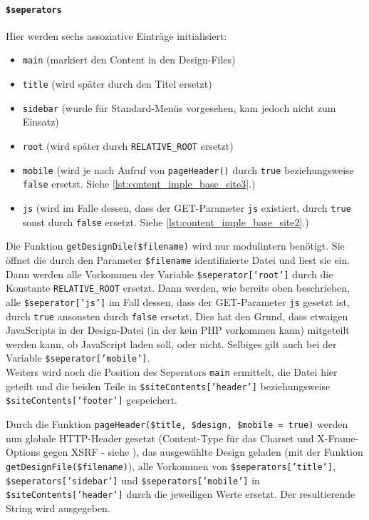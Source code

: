 \paragraph{\texttt{\$seperators}\\}
Hier werden sechs assoziative Einträge initialisiert:
\begin{itemize}
	\item \texttt{main} (markiert den Content in den Design-Files)
	\item \texttt{title} (wird später durch den Titel ersetzt)
	\item \texttt{sidebar} (wurde für Standard-Menüs vorgesehen, kam jedoch nicht zum Einsatz)
	\item \texttt{root} (wird später durch \texttt{RELATIVE\_ROOT} ersetzt)
	\item \texttt{mobile} (wird je nach Aufruf von \texttt{pageHeader()} durch \texttt{true} beziehungsweise \texttt{false} ersetzt. Siehe \autoref{lst:content_imple_base_site3}.)
	\item \texttt{js} (wird im Falle dessen, dass der GET-Parameter \texttt{js} existiert, durch \texttt{true} sonst durch \texttt{false} ersetzt. Siehe \autoref{lst:content_imple_base_site2}.)
\end{itemize}


Die Funktion \texttt{getDesignDile(\$filename)} wird nur modulintern benötigt. Sie öffnet die durch den Parameter \texttt{\$filename} identifizierte Datei und liest sie ein. Dann werden alle Vorkommen der Variable \texttt{\$seperator['root']} durch die Konstante \texttt{RELATIVE\_ROOT} ersetzt. Dann werden, wie bereits oben beschrieben, alle \texttt{\$seperator['js']} im Fall dessen, dass der GET-Parameter \texttt{js} gesetzt ist, durch \texttt{true} ansonsten durch \texttt{false} ersetzt. Dies hat den Grund, dass etwaigen JavaScripts in der Design-Datei (in der kein PHP vorkommen kann) mitgeteilt werden kann, ob JavaScript laden soll, oder nicht. Selbiges gilt auch bei der Variable \texttt{\$seperator['mobile']}.\\
Weiters wird noch die Position des Seperators \texttt{main} ermittelt, die Datei hier geteilt und die beiden Teile in \texttt{\$siteContents['header']} beziehungsweise \texttt{\$siteContents['footer']} gespeichert.


Durch die Funktion \texttt{pageHeader(\$title, \$design, \$mobile = true)} werden nun globale HTTP-Header gesetzt (Content-Type für das Charset und X-Frame-Options gegen XSRF - siehe ), das ausgewählte Design geladen (mit der Funktion \texttt{getDesignFile(\$filename)}), alle Vorkommen von \texttt{\$seperators['title']}, \texttt{\$seperators['sidebar']} und \texttt{\$seperators['mobile']} in \texttt{\$siteContents['header']} durch die jeweiligen Werte ersetzt. Der resultierende String wird ausgegeben. 

